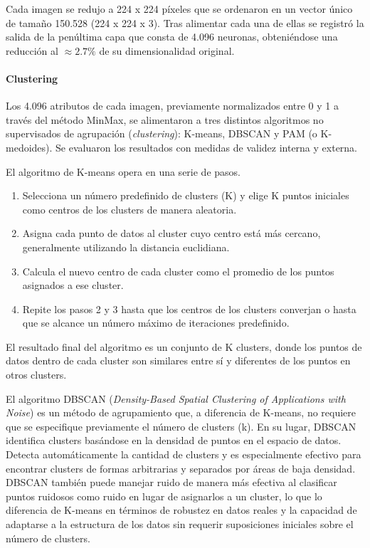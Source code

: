 \documentclass{article}
\begin{document}
Cada imagen se redujo a 224 x 224 píxeles que se ordenaron en un vector único de tamaño 150.528 (224 x 224 x 3).
Tras alimentar cada una de ellas se registró la salida de la penúltima capa que consta de 4.096 neuronas, obteniéndose una reducción al \(\approx 2.7\%\) de su dimensionalidad original.
 

\paragraph{Clustering} 
Los 4.096 atributos de cada imagen, previamente normalizados entre 0 y 1 a través del método MinMax, se alimentaron a tres distintos algoritmos no supervisados de agrupación (\textit{clustering}): K-means, DBSCAN y PAM (o K-medoides).  
Se evaluaron los resultados con medidas de validez interna y externa.

El algoritmo de K-means opera en una serie de pasos. 
\begin{enumerate}
  \item Selecciona un número predefinido de clusters (K) y elige K puntos iniciales como centros de los clusters de manera aleatoria.
  \item Asigna cada punto de datos al cluster cuyo centro está más cercano, generalmente utilizando la distancia euclidiana.
  \item Calcula el nuevo centro de cada cluster como el promedio de los puntos asignados a ese cluster.
  \item Repite los pasos 2 y 3 hasta que los centros de los clusters converjan o hasta que se alcance un número máximo de iteraciones predefinido.
\end{enumerate}
El resultado final del algoritmo es un conjunto de K clusters, donde los puntos de datos dentro de cada cluster son similares entre sí y diferentes de los puntos en otros clusters.

El algoritmo DBSCAN (\textit{Density-Based Spatial Clustering of Applications with Noise}) es un método de agrupamiento que, a diferencia de K-means, no requiere que se especifique previamente el número de clusters (k).
En su lugar, DBSCAN identifica clusters basándose en la densidad de puntos en el espacio de datos.
Detecta automáticamente la cantidad de clusters y es especialmente efectivo para encontrar clusters de formas arbitrarias y separados por áreas de baja densidad.
DBSCAN también puede manejar ruido de manera más efectiva al clasificar puntos ruidosos como ruido en lugar de asignarlos a un cluster, lo que lo diferencia de K-means en términos de robustez en datos reales y la capacidad de adaptarse a la estructura de los datos sin requerir suposiciones iniciales sobre el número de clusters.
\end{document}
